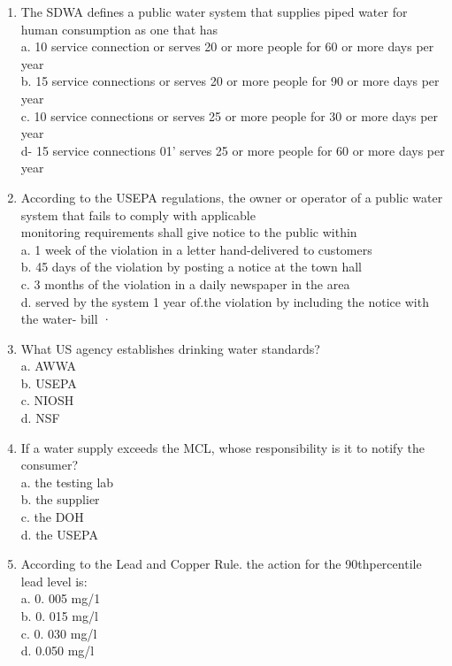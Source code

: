 \documentclass{article}
\begin{document}
\begin{enumerate}
\item The SDWA defines a public water system that supplies piped water for human consumption as one that has\\
a.	10 service connection or serves 20 or more people for 60 or more days per year\\
b.	15 service connections or serves 20 or more people for 90 or more days per year\\
c.	10 service connections or serves 25 or more people for 30 or more days per year\\
d-	15 service connections 01' serves 25 or more people for 60 or more days per year\\

\item According to the USEPA regulations, the owner or operator of a public water system that fails to comply with applicable\\
monitoring requirements shall give notice to the public within\\
a.	1 week of the violation in a letter hand-delivered to customers\\
b.	45 days of the violation by posting a notice at the town hall\\
c. 	3 months of the violation in a daily newspaper in the area\\
d.	served by the system 1 year of.the violation by including the notice with the water- bill ·\\

\item What US agency establishes drinking water standards?\\
a.	AWWA\\
b.	USEPA\\
c.	NIOSH\\
d.	NSF\\

\item If a water supply exceeds the MCL, whose responsibility is it to notify the consumer?\\
a.	the testing lab\\
b. 	the supplier\\
c.	the DOH\\
d.	the USEPA\\

\item According to the Lead and Copper Rule. the action for the 90thpercentile lead level is:\\
a.	0. 005 mg/1\\
b.	0. 015 mg/l\\
c.	0. 030 mg/l\\
d.	0.050 mg/l\\



\end{enumerate}
\end{document}
